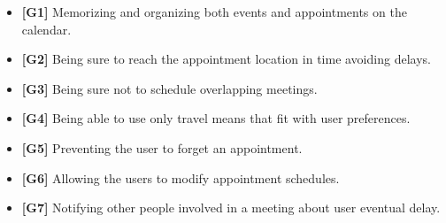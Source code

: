 \begin{itemize}

\item \textbf{[\hypertarget{G1}{G1}]}  Memorizing and organizing both events and appointments on the calendar. 

\item \textbf{[\hypertarget{G2}{G2}]} Being sure to reach the appointment location in time avoiding delays. \label{G2}

\item \textbf{[\hypertarget{G3}{G3}]} Being sure not to schedule overlapping meetings. \label{G3}

\item \textbf{[\hypertarget{G4}{G4}]} Being able to use only travel means that fit with user preferences. \label{G4}

\item \textbf{[\hypertarget{G5}{G5}]} Preventing the user to forget an appointment. \label{G5}

\item \textbf{[\hypertarget{G6}{G6}]} Allowing the users to modify appointment schedules. \label{G6}

\item \textbf{[\hypertarget{G7}{G7}]} Notifying other people involved in a meeting about user eventual delay. \label{G7}

\end{itemize}